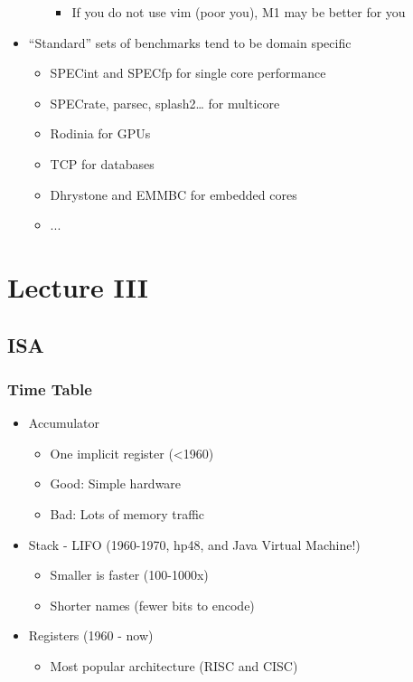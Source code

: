 \documentclass[12pt]{article}
\begin{document}
\begin{itemize}
\begin{itemize}
\begin{itemize}
                                \item {If you do not use vim (poor you), M1 may be better for you}
                            \end{itemize}
                    \end{itemize}
                \item {“Standard” sets of benchmarks tend to be domain specific}
                    \begin{itemize}
                        \item {SPECint and SPECfp for single core performance}
                        \item {SPECrate, parsec, splash2… for multicore}
                        \item {Rodinia for GPUs}
                        \item {TCP for databases}
                        \item {Dhrystone and EMMBC for embedded cores}
                        \item {...}
                    \end{itemize}
            \end{itemize}
    \section{Lecture III}
        \subsection{ISA}
            \subsubsection{Time Table}
                \begin{itemize}
                    \item Accumulator
                        \begin{itemize}
                            \item One implicit register (<1960)
                            \item Good: Simple hardware
                            \item Bad: Lots of memory traffic
                        \end{itemize}
                    \item Stack - LIFO (1960-1970, hp48, and Java Virtual Machine!)
                        \begin{itemize}
                            \item Smaller is faster (100-1000x)
                            \item Shorter names (fewer bits to encode)
                        \end{itemize}
                    \item Registers (1960 - now)
                        \begin{itemize}
                            \item Most popular architecture (RISC and CISC)
                        \end{itemize}
                \end{itemize}
\end{document}
